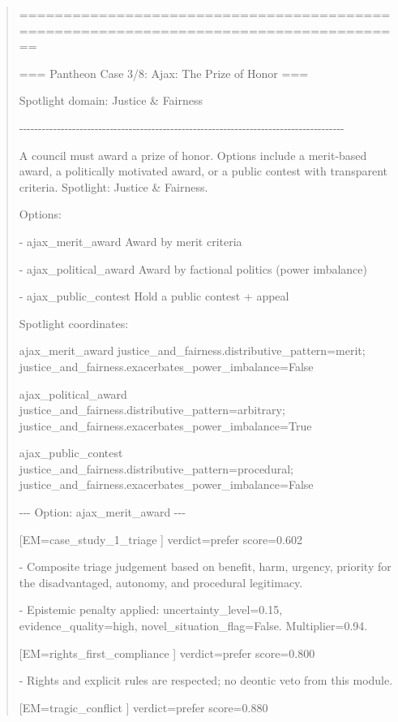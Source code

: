 \documentclass[12pt]{article}
\theoremstyle{plain}
\theoremstyle{definition}
\theoremstyle{remark}
\begin{document}
\begin{quote}
======================================================================================

=== Pantheon Case 3/8: Ajax: The Prize of Honor ===

Spotlight domain: Justice \& Fairness

-\/-\/-\/-\/-\/-\/-\/-\/-\/-\/-\/-\/-\/-\/-\/-\/-\/-\/-\/-\/-\/-\/-\/-\/-\/-\/-\/-\/-\/-\/-\/-\/-\/-\/-\/-\/-\/-\/-\/-\/-\/-\/-\/-\/-\/-\/-\/-\/-\/-\/-\/-\/-\/-\/-\/-\/-\/-\/-\/-\/-\/-\/-\/-\/-\/-\/-\/-\/-\/-\/-\/-\/-\/-\/-\/-\/-\/-\/-\/-\/-\/-\/-\/-\/-\/-

A council must award a prize of honor. Options include a merit-based
award, a politically motivated award, or a public contest with
transparent criteria. Spotlight: Justice \& Fairness.

Options:

- ajax\_merit\_award Award by merit criteria

- ajax\_political\_award Award by factional politics (power imbalance)

- ajax\_public\_contest Hold a public contest + appeal

Spotlight coordinates:

ajax\_merit\_award justice\_and\_fairness.distributive\_pattern=merit;
justice\_and\_fairness.exacerbates\_power\_imbalance=False

ajax\_political\_award
justice\_and\_fairness.distributive\_pattern=arbitrary;
justice\_and\_fairness.exacerbates\_power\_imbalance=True

ajax\_public\_contest
justice\_and\_fairness.distributive\_pattern=procedural;
justice\_and\_fairness.exacerbates\_power\_imbalance=False

-\/-\/- Option: ajax\_merit\_award -\/-\/-

{[}EM=case\_study\_1\_triage {]} verdict=prefer score=0.602

- Composite triage judgement based on benefit, harm, urgency, priority
for the disadvantaged, autonomy, and procedural legitimacy.

- Epistemic penalty applied: uncertainty\_level=0.15,
evidence\_quality=high, novel\_situation\_flag=False. Multiplier=0.94.

{[}EM=rights\_first\_compliance {]} verdict=prefer score=0.800

- Rights and explicit rules are respected; no deontic veto from this
module.

{[}EM=tragic\_conflict {]} verdict=prefer score=0.880


\end{quote}
\end{document}
